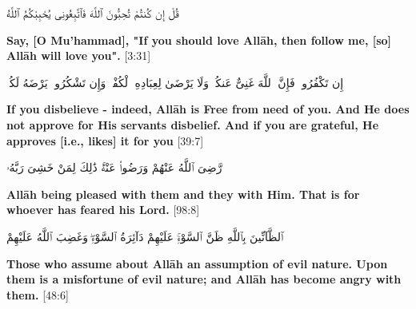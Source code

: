 \begin{center}
    \begin{RLtext}
        قُلْ إِن كُنتُمْ تُحِبُّونَ ٱللَّهَ فَٱتَّبِعُونِى يُحْبِبْكُمُ ٱللَّهُ 
    \end{RLtext}
    \textbf{Say, [O Mu'hammad], "If you should love All\=ah, then follow me, [so] All\=ah will love you".} [3:31]
\end{center}
\begin{center}
    \begin{RLtext}
        إِن تَكْفُرُوا۟ فَإِنَّ ٱللَّهَ غَنِىٌّ عَنكُمْۖ وَلَا يَرْضَىٰ لِعِبَادِهِ ٱلْكُفْرَۖ وَإِن تَشْكُرُوا۟ يَرْضَهُ لَكُمْۗ 
    \end{RLtext}
\end{center}
\textbf{If you disbelieve - indeed, Allāh is Free from need of you. And He does not approve for His servants disbelief. And if you are grateful, He approves [i.e., likes] it for you} [39:7]
\begin{center}
    \begin{RLtext}
        رَّضِىَ ٱللَّهُ عَنْهُمْ وَرَضُوا۟ عَنْهُۚ ذَٰلِكَ لِمَنْ خَشِىَ رَبَّهُۥ 
    \end{RLtext}
    \textbf{All\=ah being pleased with them and they with Him. That is for whoever has feared his Lord.} [98:8]
\end{center}
\begin{center}
    \begin{RLtext}
        ٱلظَّآنِّينَ بِٱللَّهِ ظَنَّ ٱلسَّوْءِۚ عَلَيْهِمْ دَآئِرَةُ ٱلسَّوْءِۖ وَغَضِبَ ٱللَّهُ عَلَيْهِمْ 
    \end{RLtext}
    \textbf{Those who assume about Allāh an assumption of evil nature. Upon them is a misfortune of evil nature; and Allāh has become angry with them.} [48:6]
\end{center}

